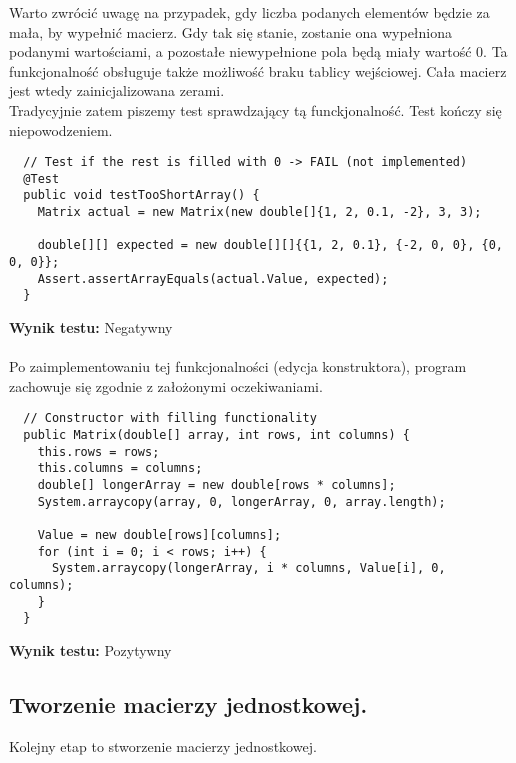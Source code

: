 \documentclass[a4paper,12pt,twoside]{article}
\begin{document}
Warto zwrócić uwagę na przypadek, gdy liczba podanych elementów będzie za mała, by wypełnić macierz.
Gdy tak się stanie, zostanie ona wypełniona podanymi wartościami, a pozostałe niewypełnione pola będą miały wartość 0.
Ta funkcjonalność obsługuje także możliwość braku tablicy wejściowej. Cała macierz jest wtedy zainicjalizowana
zerami.\\

\noindent
Tradycyjnie zatem piszemy test sprawdzający tą funckjonalność. Test kończy się niepowodzeniem.\\

\begin{lstlisting}
  // Test if the rest is filled with 0 -> FAIL (not implemented)
  @Test
  public void testTooShortArray() {
    Matrix actual = new Matrix(new double[]{1, 2, 0.1, -2}, 3, 3);

    double[][] expected = new double[][]{{1, 2, 0.1}, {-2, 0, 0}, {0, 0, 0}};
    Assert.assertArrayEquals(actual.Value, expected);
  }
\end{lstlisting}
\medskip

\noindent
\textbf{Wynik testu: }{\color{red} Negatywny}\\\\
Po zaimplementowaniu tej funkcjonalności (edycja konstruktora), program
zachowuje się zgodnie z założonymi oczekiwaniami.\\

\begin{lstlisting}
  // Constructor with filling functionality
  public Matrix(double[] array, int rows, int columns) {
    this.rows = rows;
    this.columns = columns;
    double[] longerArray = new double[rows * columns];
    System.arraycopy(array, 0, longerArray, 0, array.length);

    Value = new double[rows][columns];
    for (int i = 0; i < rows; i++) {
      System.arraycopy(longerArray, i * columns, Value[i], 0, columns);
    }
  }
\end{lstlisting}
\medskip

\noindent
\textbf{Wynik testu: }{\color{green} Pozytywny}


\subsection{Tworzenie macierzy jednostkowej.}
\bigskip

Kolejny etap to stworzenie macierzy jednostkowej.\\
\end{document}
